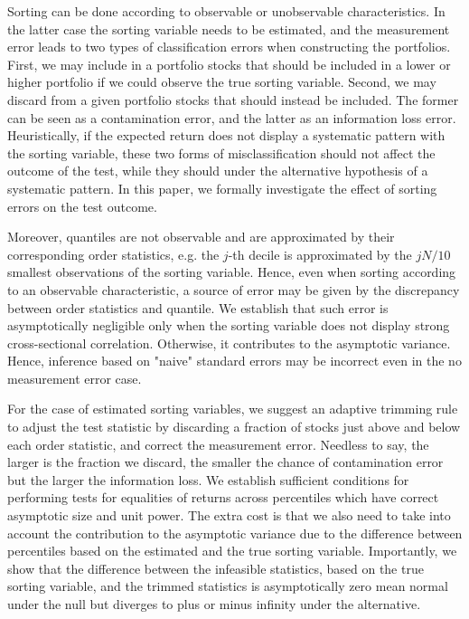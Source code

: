 Sorting can be done according to observable or unobservable characteristics. In the latter case the sorting variable needs to be estimated, and the measurement error leads to two types of classification errors when constructing the portfolios. First, we may include in a portfolio stocks that should be included in a lower or higher portfolio if we could observe the true sorting variable. Second, we may discard from a given portfolio stocks that should instead be included. The former can be seen as a contamination error, and the latter as an information loss error. Heuristically, if the expected return does not display a systematic pattern with the sorting variable, these two forms of misclassification should not affect the outcome of the test, while they should under the alternative hypothesis of a systematic pattern. In this paper, we formally investigate the effect of sorting errors on the test outcome. 

Moreover, quantiles are not observable and are approximated by their corresponding order statistics, e.g. the $j$-th decile is approximated by the $jN/10$ smallest observations of the sorting variable. Hence, even when sorting according to an observable characteristic, a source of error may be given by the discrepancy between order statistics and quantile. We establish that such error is asymptotically negligible only when the sorting variable does not display strong cross-sectional correlation. Otherwise, it contributes to the asymptotic variance. Hence, inference based on "naive" standard errors may be incorrect even in the no measurement error case.

For the case of estimated sorting variables, we suggest an adaptive trimming rule to adjust the test statistic by discarding a fraction of stocks just above and below each order statistic, and correct the measurement error. Needless to say, the larger is the fraction we discard, the smaller the chance of contamination error but the larger the information loss. %
We establish sufficient conditions for performing tests for equalities of returns across percentiles which have correct asymptotic size and unit power. The extra cost is that we also need to take into account the contribution to the asymptotic variance due to the difference between percentiles based on the estimated and the true sorting variable. Importantly, we show that the difference between the infeasible statistics, based on the true sorting variable, and the trimmed statistics is asymptotically zero mean normal under the null but diverges to plus or minus infinity under the alternative.

